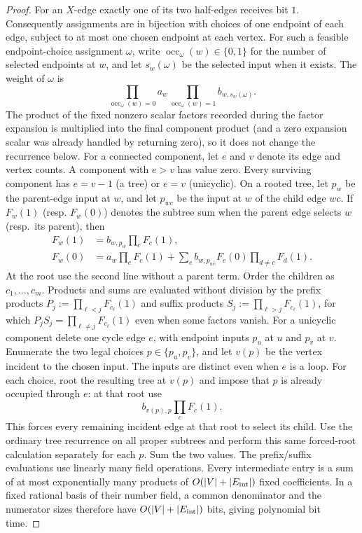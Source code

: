 \documentclass[11pt,letterpaper,onecolumn]{article}
\theoremstyle{plain}
\theoremstyle{definition}
\theoremstyle{remark}
\begin{document}
\begin{proof}
For an \(X\)-edge exactly one of its two half-edges receives bit \(1\).
Consequently assignments are in bijection with choices of one endpoint of
each edge, subject to at most one chosen endpoint at each vertex.  For such a
feasible endpoint-choice assignment \(\omega\), write
\(\operatorname{occ}_\omega(w)\in\{0,1\}\) for the number of selected
endpoints at \(w\), and let \(s_w(\omega)\) be the selected input when it
exists.  The weight of \(\omega\) is
\[
  \prod_{\operatorname{occ}_\omega(w)=0}a_w
  \prod_{\operatorname{occ}_\omega(w)=1}b_{w,s_w(\omega)}.
\]
The product of the fixed nonzero scalar factors recorded during the
factor expansion is multiplied into the final component product (and a
zero expansion scalar was already handled by returning zero), so it does
not change the recurrence below.
For a connected component, let \(e\) and \(v\) denote its edge and vertex
counts.  A component with \(e>v\) has value zero.  Every surviving component
has \(e=v-1\) (a tree) or \(e=v\) (unicyclic).
On a rooted tree, let \(p_w\) be the parent-edge input at \(w\),
and let \(p_{wc}\) be the input at \(w\) of the child edge \(wc\).  If
\(F_w(1)\) (resp. \(F_w(0)\)) denotes the subtree sum when the parent edge
selects \(w\) (resp.\ its parent), then
\[
\begin{aligned}
 F_w(1)&=b_{w,p_w}\prod_cF_c(1),\\
 F_w(0)&=a_w\prod_cF_c(1)+
 \sum_c b_{w,p_{wc}}F_c(0)\prod_{d\ne c}F_d(1).
\end{aligned}
\]
At the root use the second line without a parent term.  Order the children as
\(c_1,\ldots,c_m\).  Products and sums are evaluated without division by
the prefix products
\(P_j:=\prod_{\ell<j}F_{c_\ell}(1)\) and suffix products
\(S_j:=\prod_{\ell>j}F_{c_\ell}(1)\), for which
\(P_jS_j=\prod_{\ell\ne j}F_{c_\ell}(1)\) even
when some factors vanish.  For a unicyclic component delete one cycle
edge \(e\), with endpoint inputs \(p_u\) at \(u\) and \(p_v\) at \(v\).
Enumerate the two legal choices \(p\in\{p_u,p_v\}\), and let \(v(p)\)
be the vertex incident to the chosen input.  The inputs are distinct even
when \(e\) is a loop.  For each choice, root the resulting tree at
\(v(p)\) and impose that \(p\) is already occupied through \(e\):
at that root use
\[
 b_{v(p),p}\prod_cF_c(1).
\]
This forces every remaining incident edge at that root to select its child.
Use the ordinary
tree recurrence on all proper subtrees and perform this same forced-root
calculation separately for each \(p\). Sum the two values.
The prefix/suffix evaluations use linearly many field operations.  Every
intermediate entry is a sum of at most exponentially many products of
\(O(|V|+|E_{\rm int}|)\) fixed coefficients.  In a fixed rational basis of
their number field, a common denominator and the numerator sizes therefore
have \(O(|V|+|E_{\rm int}|)\) bits, giving polynomial bit time.
\end{proof}
\end{document}
